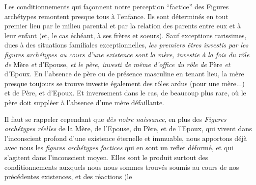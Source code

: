 Les conditionnements qui façonnent notre perception ``factice'' des Figures archétypes remontent presque tous à l'enfance. Ils sont déterminés en tout premier lieu par le milieu parental et par la relation des parents entre eux et à leur enfant (et, le cas échéant, à ses frères et soeurs). Sauf exceptions rarissimes, dues à des situations familiales exceptionnelles, \textit{les premiers êtres investis par les figures archétypes au cours d'une existence sont la mère, investie à la fois du rôle de} Mère \textit{et} d'Epouse, \textit{et le père, investi de même d'office du rôle de} Père \textit{et} d'Epoux. En l'absence de père ou de présence masculine en tenant lieu, la mère presque toujours se trouve investie également des rôles ardus (pour une mère...) et de Père, et d'Epoux. Et inversement dans le cas, de beaucoup plus rare, où le père doit suppléer à l'absence d'une mère défaillante.

Il faut se rappeler cependant que \textit{dès notre naissance}, en plus des \textit{Figures archétypes réelles} de la Mère, de l'Epouse, du Père, et de l'Epoux, qui vivent dans l'inconscient profond d'une existence éternelle et immuable, nous apportons déjà avec nous les \textit{figures archétypes factices} qui en sont un reflet déformé, et qui s'agitent dans l'inconscient moyen. Elles sont le produit surtout des conditionnements auxquels nous nous sommes trouvés soumis au cours de nos précédentes existences, et des réactions (le


